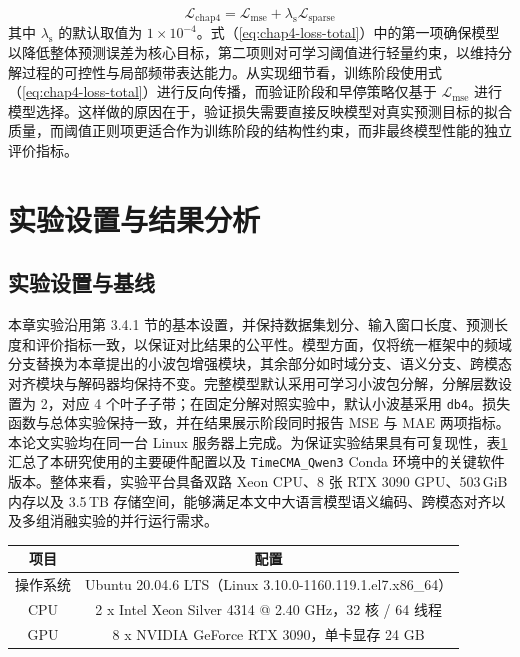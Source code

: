 \begin{equation}
\mathcal{L}_{\mathrm{chap4}}
=\mathcal{L}_{\mathrm{mse}}
+\lambda_{\mathrm{s}}\mathcal{L}_{\mathrm{sparse}}
\label{eq:chap4-loss-total}
\end{equation}
其中 $\lambda_{\mathrm{s}}$ 的默认取值为 $1\times 10^{-4}$。式（\ref{eq:chap4-loss-total}）中的第一项确保模型以降低整体预测误差为核心目标，第二项则对可学习阈值进行轻量约束，以维持分解过程的可控性与局部频带表达能力。从实现细节看，训练阶段使用式（\ref{eq:chap4-loss-total}）进行反向传播，而验证阶段和早停策略仅基于 $\mathcal{L}_{\mathrm{mse}}$ 进行模型选择。这样做的原因在于，验证损失需要直接反映模型对真实预测目标的拟合质量，而阈值正则项更适合作为训练阶段的结构性约束，而非最终模型性能的独立评价指标。 \section{实验设置与结果分析} \subsection{实验设置与基线} 本章实验沿用第 3.4.1 节的基本设置，并保持数据集划分、输入窗口长度、预测长度和评价指标一致，以保证对比结果的公平性。模型方面，仅将统一框架中的频域分支替换为本章提出的小波包增强模块，其余部分如时域分支、语义分支、跨模态对齐模块与解码器均保持不变。完整模型默认采用可学习小波包分解，分解层数设置为 2，对应 4 个叶子子带；在固定分解对照实验中，默认小波基采用 \texttt{db4}。损失函数与总体实验保持一致，并在结果展示阶段同时报告 MSE 与 MAE 两项指标。 本论文实验均在同一台 Linux 服务器上完成。为保证实验结果具有可复现性，表\ref{tab:chap4-exp-env}汇总了本研究使用的主要硬件配置以及 \texttt{TimeCMA\_Qwen3} Conda 环境中的关键软件版本。整体来看，实验平台具备双路 Xeon CPU、8 张 RTX 3090 GPU、503\,GiB 内存以及 3.5\,TB 存储空间，能够满足本文中大语言模型语义编码、跨模态对齐以及多组消融实验的并行运行需求。 \begin{table}[!htb]
\centering
\small
\setlength{\tabcolsep}{4.2pt}
\renewcommand{\arraystretch}{1.02}
\label{tab:chap4-exp-env}
\begin{tabular}{c|c}
\toprule
\textbf{项目} & \textbf{配置} \\
\midrule
操作系统 & Ubuntu 20.04.6 LTS（Linux 3.10.0-1160.119.1.el7.x86\_64） \\
CPU & 2 x Intel Xeon Silver 4314 @ 2.40 GHz，32 核 / 64 线程 \\
GPU & 8 x NVIDIA GeForce RTX 3090，单卡显存 24 GB \\

\end{tabular}
\end{table}
